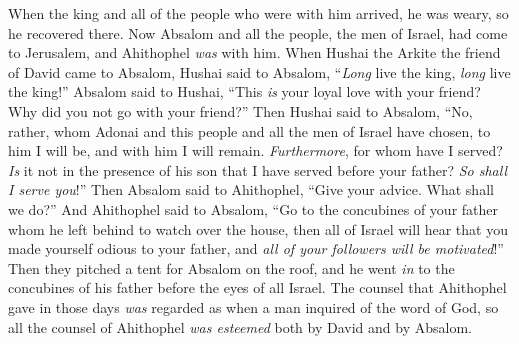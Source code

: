 \begin{biblechapter}
\verse When the king and all of the people who were with him arrived, he was weary, so he recovered there.
 Now Absalom and all the people, the men of Israel, had come to Jerusalem, and Ahithophel \textit{was} with him.
\verse When Hushai the Arkite the friend of David came to Absalom, Hushai said to Absalom, “\textit{Long} live the king, \textit{long} live the king!”
\verse Absalom said to Hushai, “This \textit{is} your loyal love with your friend? Why did you not go with your friend?”
\verse Then Hushai said to Absalom, “No, rather, whom Adonai and this people and all the men of Israel have chosen, to him I will be, and with him I will remain.
\verse \textit{Furthermore}, for whom have I served? \textit{Is} it not in the presence of his son that I have served before your father? \textit{So shall I serve you}!”
\verse Then Absalom said to Ahithophel, “Give your advice. What shall we do?”
\verse And Ahithophel said to Absalom, “Go to the concubines of your father whom he left behind to watch over the house, then all of Israel will hear that you made yourself odious to your father, and \textit{all of your followers will be motivated}!”
\verse Then they pitched a tent for Absalom on the roof, and he went \textit{in} to the concubines of his father before the eyes of all Israel.
\verse The counsel that Ahithophel gave in those days \textit{was} regarded as when a man inquired of the word of God, so all the counsel of Ahithophel \textit{was esteemed} both by David and by Absalom.
\end{biblechapter}

